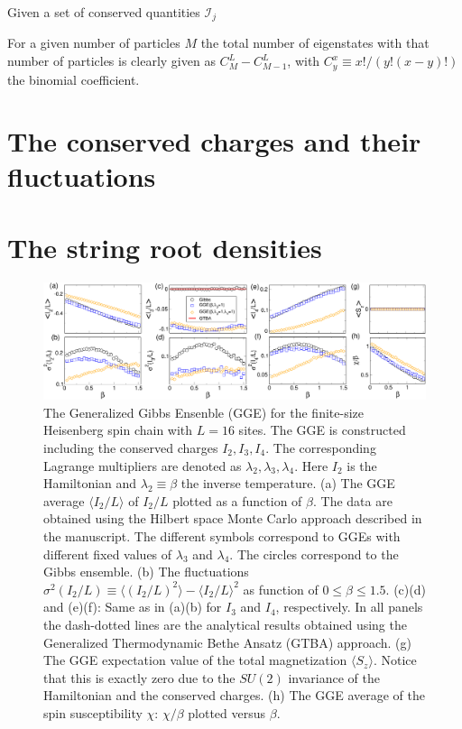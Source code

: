 \documentclass[twocolumn,superscriptaddress,prb,10pt]{revtex4-1}
\begin{document}
Given a set of conserved quantities ${\mathcal I}_j$

For a given number of particles $M$ the total number of eigenstates with 
that number of particles is clearly given as $C_M^L-C_{M-1}^L$, with 
$C_y^x\equiv x!/(y!(x-y)!)$ the binomial coefficient.

\section{The conserved charges and their fluctuations}



\section{The string root densities}


\begin{figure}[t]
\includegraphics*[width=0.93\linewidth]{./draft_figs/fig1}
\caption{The Generalized Gibbs Ensenble (GGE) for the finite-size Heisenberg spin 
 chain with $L=16$ sites. The GGE is constructed including the conserved charges  
 $I_2, I_3,I_4$. The corresponding Lagrange multipliers are denoted  as $\lambda_2,
 \lambda_3,\lambda_4$. Here $I_2$ is the Hamiltonian and $\lambda_2\equiv\beta$ the 
 inverse temperature. (a) The GGE average $\langle I_2/L\rangle$ of $I_2/L$ plotted 
 as a function of $\beta$. The data are obtained using the Hilbert space Monte Carlo 
 approach described in the manuscript. The different symbols correspond to GGEs with 
 different fixed  values of $\lambda_3$ and $\lambda_4$. The circles correspond to the 
 Gibbs ensemble. (b) The fluctuations $\sigma^2(I_2/L)\equiv \langle (I_2/L)^2\rangle-
 \langle I_2/L\rangle^2$ as function of $0\le\beta\le 1.5$. (c)(d) and (e)(f): Same 
 as in (a)(b) for $I_3$ and $I_4$, respectively. In all panels the dash-dotted lines  
 are the analytical results obtained using the Generalized Thermodynamic Bethe 
 Ansatz (GTBA) approach. (g) The GGE expectation value of the total magnetization 
 $\langle S_z\rangle$. Notice that this is exactly zero due to the $SU(2)$ invariance 
 of the Hamiltonian and the conserved charges. (h) The GGE average of the spin 
 susceptibility $\chi$: $\chi/\beta$ plotted versus $\beta$. 
}
\label{fig1}
\end{figure}
\end{document}
